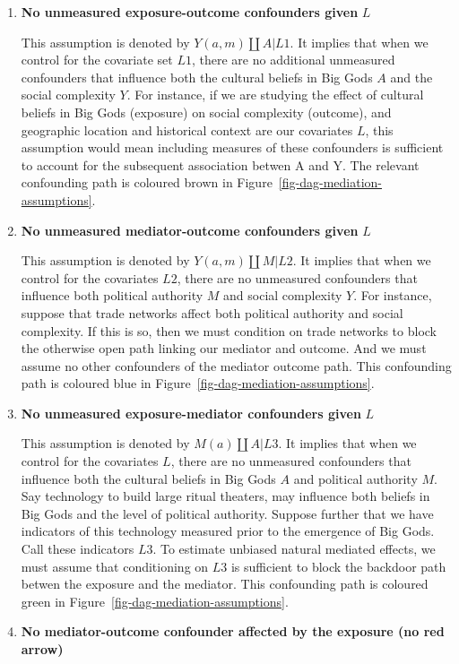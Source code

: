 \documentclass[
  singlecolumn]{report}
\begin{document}
\begin{enumerate}
\def\labelenumi{\arabic{enumi}.}
\item
  \textbf{No unmeasured exposure-outcome confounders given} \(L\)

  This assumption is denoted by \(Y(a,m) \coprod A | L1\). It implies
  that when we control for the covariate set \(L1\), there are no
  additional unmeasured confounders that influence both the cultural
  beliefs in Big Gods \(A\) and the social complexity \(Y\). For
  instance, if we are studying the effect of cultural beliefs in Big
  Gods (exposure) on social complexity (outcome), and geographic
  location and historical context are our covariates \(L\), this
  assumption would mean including measures of these confounders is
  sufficient to account for the subsequent association betwen A and Y.
  The relevant confounding path is coloured brown in
  Figure~\ref{fig-dag-mediation-assumptions}.
\item
  \textbf{No unmeasured mediator-outcome confounders given} \(L\)

  This assumption is denoted by \(Y(a,m) \coprod M | L2\). It implies
  that when we control for the covariates \(L2\), there are no
  unmeasured confounders that influence both political authority \(M\)
  and social complexity \(Y\). For instance, suppose that trade networks
  affect both political authority and social complexity. If this is so,
  then we must condition on trade networks to block the otherwise open
  path linking our mediator and outcome. And we must assume no other
  confounders of the mediator outcome path. This confounding path is
  coloured blue in Figure~\ref{fig-dag-mediation-assumptions}.
\item
  \textbf{No unmeasured exposure-mediator confounders given} \(L\)

  This assumption is denoted by \(M(a) \coprod A | L3\). It implies that
  when we control for the covariates \(L\), there are no unmeasured
  confounders that influence both the cultural beliefs in Big Gods \(A\)
  and political authority \(M\). Say technology to build large ritual
  theaters, may influence both beliefs in Big Gods and the level of
  political authority. Suppose further that we have indicators of this
  technology measured prior to the emergence of Big Gods. Call these
  indicators \(L3\). To estimate unbiased natural mediated effects, we
  must assume that conditioning on \(L3\) is sufficient to block the
  backdoor path betwen the exposure and the mediator. This confounding
  path is coloured green in Figure~\ref{fig-dag-mediation-assumptions}.
\item
  \textbf{No mediator-outcome confounder affected by the exposure (no
  red arrow)}
\end{enumerate}
\end{document}

